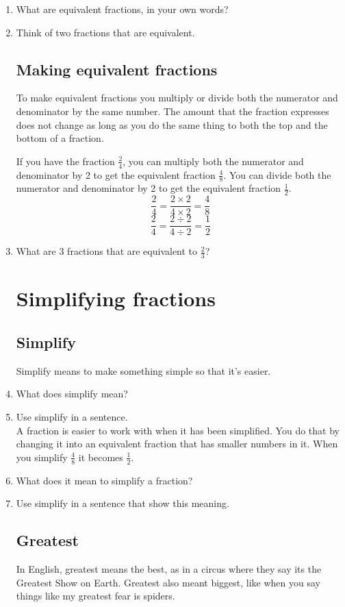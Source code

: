 \documentclass[14pt]{article}
\begin{document}
\begin{enumerate}
\item What are equivalent fractions, in your own words?
\item Think of two fractions that are equivalent.

\subsection*{Making equivalent fractions}

To make equivalent fractions you multiply or divide both the numerator and denominator by the same number. The amount that the fraction expresses does not change as long as you do the same thing to both the top and the bottom of a fraction.

If you have the fraction $\frac{2}{4}$, you can multiply both the numerator and denominator by 2 to get the equivalent fraction $\frac{4}{8}$. You can divide both the numerator and denominator by 2 to get the equivalent fraction $\frac{1}{2}$.
$$\frac{2}{4} = \frac{2 \times 2}{4 \times 2} = \frac{4}{8}$$
$$\frac{2}{4} = \frac{2 \div 2}{4 \div 2} = \frac{1}{2}$$

\item What are 3 fractions that are equivalent to $\frac{2}{3}$?

\section{Simplifying fractions}

\subsection*{Simplify} Simplify means to make something simple so that it's easier.

\item What does simplify mean?
\item Use simplify in a sentence.\\

A fraction is easier to work with when it has been simplified. You do that by changing it into an equivalent fraction that has smaller numbers in it. When you simplify $\frac{4}{8}$ it becomes $\frac{1}{2}$.\\

\item What does it mean to simplify a fraction?
\item Use simplify in a sentence that show this meaning.

\subsection*{Greatest} In English, greatest means the best, as in a circus where they say its the Greatest Show on Earth. Greatest also meant biggest, like when you say things like my greatest fear is spiders.


\end{enumerate}
\end{document}
